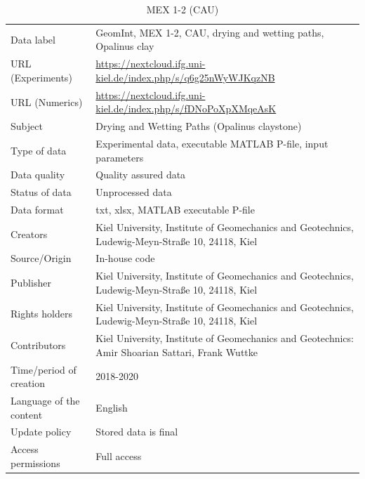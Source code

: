 \begin{table}[!ht]
\caption{MEX 1-2 (CAU)}
\label{tab:dms-mex1-2}
\small
\begin{tabular}{R{3.5cm}|L{7.5cm}}
\hline
%
Data label & GeomInt, MEX 1-2, CAU, drying and wetting paths, Opalinus clay \\
URL (Experiments) & \url{https://nextcloud.ifg.uni-kiel.de/index.php/s/q6g25nWyWJKqzNB} \\
URL (Numerics) & \url{https://nextcloud.ifg.uni-kiel.de/index.php/s/fDNoPoXpXMqeAsK} \\
Subject  &  Drying and Wetting Paths (Opalinus claystone)\\
Type of data  & Experimental data, executable MATLAB P-file, input parameters\\
Data quality  &  Quality assured data \\
Status of data  &  Unprocessed data\\
Data format  & txt, xlsx, MATLAB executable P-file\\
Creators  &  Kiel University, Institute of Geomechanics and Geotechnics, Ludewig-Meyn-Stra\ss e 10, 24118, Kiel\\
Source/Origin & In-house code \\
Publisher  &  Kiel University, Institute of Geomechanics and Geotechnics, Ludewig-Meyn-Stra\ss e 10, 24118, Kiel \\
Rights holders &  Kiel University, Institute of Geomechanics and Geotechnics, Ludewig-Meyn-Stra\ss e 10, 24118, Kiel \\
Contributors &   Kiel University, Institute of Geomechanics and Geotechnics: Amir Shoarian Sattari, Frank Wuttke\\
Time/period of creation &  2018-2020\\
Language of the content &  English\\
Update policy &  Stored data is final\\
Access permissions & Full access\\
%
\hline
\end{tabular}
\end{table}